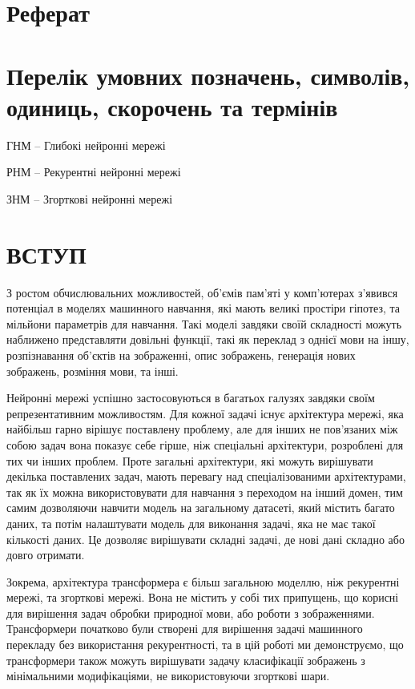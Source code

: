 \documentclass[a4paper,14pt]{extreport}
\newcommand\uchapter[1]{%
  \chapter*{#1}%
  \addcontentsline{toc}{chapter}{#1}}
\begin{document}
\newpage
\chapter*{Реферат}

\newpage
\tableofcontents

\newpage
\chapter*{Перелік умовних позначень, символів, одиниць, скорочень та термінів}
ГНМ -- Глибокі нейронні мережі

РНМ -- Рекурентні нейронні мережі

ЗНМ -- Згорткові нейронні мережі



\newpage
\uchapter{ВСТУП}
З ростом обчислювальних можливостей, об'ємів пам'яті у комп'ютерах
з'явився потенціал в моделях машинного навчання, які мають
великі простіри гіпотез, та мільйони параметрів для навчання.
Такі моделі завдяки своїй складності можуть наближено представляти
довільні функції, такі як переклад з однієї мови на іншу,
розпізнавання об'єктів на зображенні, опис зображень,
генерація нових зображень, розміння мови, та інші.

Нейронні мережі успішно застосовуються в багатьох галузях
завдяки своїм репрезентативним можливостям. Для кожної задачі
існує архітектура мережі, яка найбільш гарно вірішує поставлену
проблему, але для інших не пов'язаних між собою задач вона
показує себе гірше, ніж спеціальні архітектури, розроблені
для тих чи інших проблем. Проте загальні архітектури,
які можуть вирішувати декілька поставлених задач, мають
перевагу над спеціалізованими архітектурами, так як їх
можна використовувати для навчання з переходом на інший домен,
тим самим дозволяючи навчити модель на загальному датасеті,
який містить багато даних,
та потім налаштувати модель для виконання задачі, яка не має такої
кількості даних. Це дозволяє вирішувати складні задачі, де
нові дані складно або довго отримати.

Зокрема, архітектура трансформера є більш загальною моделлю,
ніж рекурентні мережі, та згорткові мережі. Вона не містить
у собі тих припущень,
що корисні для вирішення задач обробки природної мови, або
роботи з зображеннями. Трансформери початково були створені
для вирішення задачі машинного перекладу без використання
рекурентності, та в цій роботі ми демонструємо, що
трансформери також можуть вирішувати задачу класифікації зображень
з мінімальними модифікаціями, не використовуючи згорткові шари.
\end{document}
